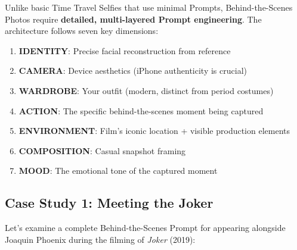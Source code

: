 Unlike basic Time Travel Selfies that use minimal Prompts, Behind-the-Scenes Photos require \textbf{detailed, multi-layered Prompt engineering}. The architecture follows seven key dimensions:

\begin{enumerate}
\item \textbf{IDENTITY}: Precise facial reconstruction from reference
\item \textbf{CAMERA}: Device aesthetics (iPhone authenticity is crucial)
\item \textbf{WARDROBE}: Your outfit (modern, distinct from period costumes)
\item \textbf{ACTION}: The specific behind-the-scenes moment being captured
\item \textbf{ENVIRONMENT}: Film's iconic location + visible production elements
\item \textbf{COMPOSITION}: Casual snapshot framing
\item \textbf{MOOD}: The emotional tone of the captured moment
\end{enumerate}

\subsection{Case Study 1: Meeting the Joker}

Let's examine a complete Behind-the-Scenes Prompt for appearing alongside Joaquin Phoenix during the filming of \textit{Joker} (2019):


